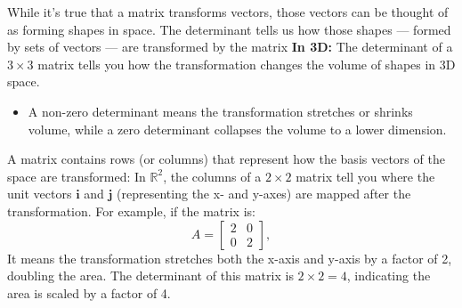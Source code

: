 \documentclass{report}
\begin{document}
\begin{itemize}
                \bigbreak \noindent 
                While it's true that a matrix transforms vectors, those vectors can be thought of as forming shapes in space. The determinant tells us how those shapes — formed by sets of vectors — are transformed by the matrix
                \bigbreak \noindent 
                \textbf{In 3D:} The determinant of a $3 \times 3$ matrix tells you how the transformation changes the volume of shapes in 3D space. 
                \begin{itemize}
                    \item A non-zero determinant means the transformation stretches or shrinks volume, while a zero determinant collapses the volume to a lower dimension.
                \end{itemize}
                \bigbreak \noindent 
                A matrix contains rows (or columns) that represent how the basis vectors of the space are transformed:
                \bigbreak \noindent 
                In $\mathbb{R}^2$, the columns of a $2 \times 2$ matrix tell you where the unit vectors $\mathbf{i}$ and $\mathbf{j}$ (representing the x- and y-axes) are mapped after the transformation.
                \bigbreak \noindent 
                For example, if the matrix is:
                \[
                    A = \begin{bmatrix} 2 & 0 \\ 0 & 2 \end{bmatrix},
                \]
                It means the transformation stretches both the x-axis and y-axis by a factor of 2, doubling the area. The determinant of this matrix is $2 \times 2 = 4$, indicating the area is scaled by a factor of 4.


\end{itemize}
\end{document}

